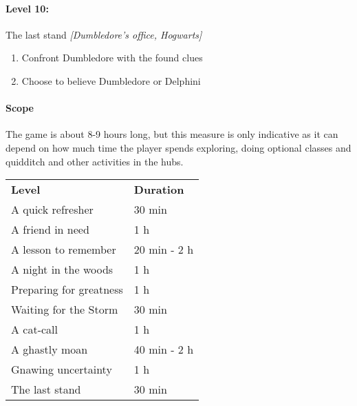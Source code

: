 \paragraph{Level 10:} The last stand \textit{[Dumbledore's office, Hogwarts]}
\begin{enumerate}[1)]
	\item Confront Dumbledore with the found clues
	\item Choose to believe Dumbledore or Delphini
\end{enumerate}

\clearpage

\paragraph{Scope}

The game is about 8-9 hours long, but this measure is only indicative as it can depend on how much time the player spends exploring, doing optional classes and quidditch and other activities in the hubs.

\begin{table}[htb]
	\begin{tabular}{ll}
		\textbf{Level} & \textbf{Duration} \\
		A quick refresher & 30 min \\
		A friend in need & 1 h \\
		A lesson to remember & 20 min - 2 h \\
		A night in the woods & 1 h \\
		Preparing for greatness & 1 h \\
		Waiting for the Storm & 30 min \\
		A cat-call & 1 h \\
		A ghastly moan & 40 min - 2 h \\
		Gnawing uncertainty & 1 h \\
		 The last stand & 30 min 
	\end{tabular}
\end{table}

\pagebreak